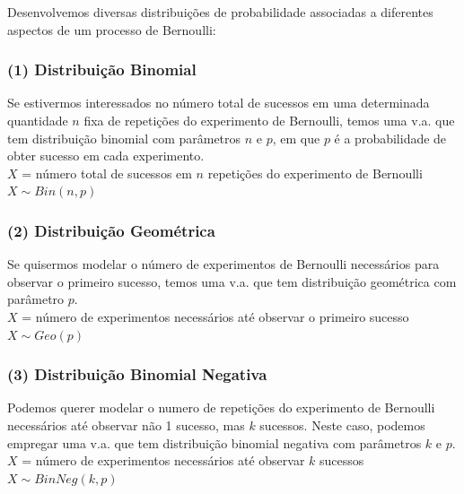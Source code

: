\documentclass[
]{book}
\theoremstyle{definition}
\theoremstyle{definition}
\theoremstyle{definition}
\theoremstyle{remark}
\begin{document}
Desenvolvemos diversas distribuições de probabilidade associadas a diferentes aspectos de um processo de Bernoulli:

\hypertarget{distribuiuxe7uxe3o-binomial-1}{%
\subsubsection*{(1) Distribuição Binomial}\label{distribuiuxe7uxe3o-binomial-1}}

Se estivermos interessados no número total de sucessos em uma determinada quantidade \(n\) fixa de repetições do experimento de Bernoulli, temos uma v.a. que tem distribuição binomial com parâmetros \(n\) e \(p\), em que \(p\) é a probabilidade de obter sucesso em cada experimento.\\
\(X\) = número total de sucessos em \(n\) repetições do experimento de Bernoulli
\(X \sim Bin (n, p)\)

\hypertarget{distribuiuxe7uxe3o-geomuxe9trica-1}{%
\subsubsection*{(2) Distribuição Geométrica}\label{distribuiuxe7uxe3o-geomuxe9trica-1}}

Se quisermos modelar o número de experimentos de Bernoulli necessários para observar o primeiro sucesso, temos uma v.a. que tem distribuição geométrica com parâmetro \(p\).\\
\(X\) = número de experimentos necessários até observar o primeiro sucesso
\(X \sim Geo (p)\)

\hypertarget{distribuiuxe7uxe3o-binomial-negativa}{%
\subsubsection*{(3) Distribuição Binomial Negativa}\label{distribuiuxe7uxe3o-binomial-negativa}}

Podemos querer modelar o numero de repetições do experimento de Bernoulli necessários até observar não 1 sucesso, mas \(k\) sucessos. Neste caso, podemos empregar uma v.a. que tem distribuição binomial negativa com parâmetros \(k\) e \(p\).\\
\(X\) = número de experimentos necessários até observar \(k\) sucessos\\
\(X \sim BinNeg (k, p)\)
\end{document}
